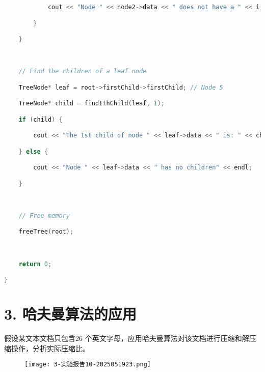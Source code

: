 \begin{lstlisting}[language=C++]
            cout << "Node " << node2->data << " does not have a " << i << "th child" << endl;

        }

    }

  

    // Find the children of a leaf node

    TreeNode* leaf = root->firstChild->firstChild; // Node 5

    TreeNode* child = findIthChild(leaf, 1);

    if (child) {

        cout << "The 1st child of node " << leaf->data << " is: " << child->data << endl;

    } else {

        cout << "Node " << leaf->data << " has no children" << endl;

    }

  

    // Free memory

    freeTree(root);

  

    return 0;

}


\end{lstlisting}
\section{3. 哈夫曼算法的应用}

假设某文本文档只包含26 个英文字母，应用哈夫曼算法对该文档进行压缩和解压缩操作，分析实际压缩比。

\begin{figure}[H]
\centering
\texttt{[image: 3-实验报告10-2025051923.png]}
\label{}
\end{figure}

